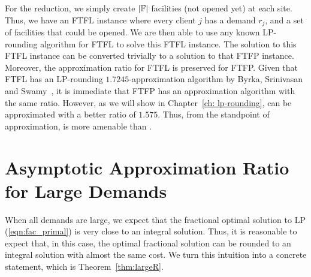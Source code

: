 \documentclass[oneside,final]{ucr}
\begin{document}
For the reduction, we simply create $|\mathbb{F}|$ facilities
(not opened yet) at each site. Thus, we have an FTFL
instance where every client $j$ has a demand $r_j$, and a
set of facilities that could be opened. We are then able to
use any known LP-rounding algorithm for FTFL to solve this
FTFL instance. The solution to this FTFL instance can be
converted trivially to a solution to that FTFP
instance. Moreover, the approximation ratio for FTFL is
preserved for FTFP. Given that FTFL has an LP-rounding
$1.7245$-approximation algorithm by Byrka, Srinivasan and
Swamy~\cite{ByrkaSS10}, it is immediate that FTFP has an
approximation algorithm with the same ratio. However, as we
will show in Chapter~\ref{ch: lp-rounding}, {\FTFP} can be
approximated with a better ratio of $1.575$. Thus, from the
standpoint of approximation, {\FTFP} is more amenable than
{\FTFL}.

\section{Asymptotic Approximation Ratio for Large
  Demands}
\label{sec: large_demands}
When all demands are large, we expect that the fractional
optimal solution to LP (\ref{eqn:fac_primal}) is very close
to an integral solution. Thus, it is reasonable to expect
that, in this case, the optimal fractional solution can be
rounded to an integral solution with almost the same
cost. We turn this intuition into a concrete statement,
which is Theorem~\ref{thm:largeR}.
\end{document}
